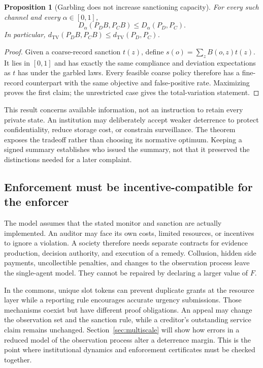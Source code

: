 \documentclass[11pt,letterpaper]{article}
\theoremstyle{plain}
\newtheorem{proposition}{Proposition}[section]
\theoremstyle{definition}
\theoremstyle{remark}
\newcommand{\TV}{d_{\mathrm{TV}}}
\begin{document}
\begin{proposition}[Garbling does not increase sanctioning capacity]\label{prop:enforcement-garbling}
For every such channel and every $\alpha\in[0,1]$,
\[
D_\alpha(P_D B,P_C B)\leq D_\alpha(P_D,P_C).
\]
In particular, $\TV(P_D B,P_C B)\leq\TV(P_D,P_C)$.
\end{proposition}
\begin{proof}
Given a coarse-record sanction $t(z)$, define $s(o)=\sum_z B(o,z)t(z)$. It lies in $[0,1]$ and has exactly the same compliance and deviation expectations as $t$ has under the garbled laws. Every feasible coarse policy therefore has a fine-record counterpart with the same objective and false-positive rate. Maximizing proves the first claim; the unrestricted case gives the total-variation statement.
\end{proof}

This result concerns available information, not an instruction to retain every private state. An institution may deliberately accept weaker deterrence to protect confidentiality, reduce storage cost, or constrain surveillance. The theorem exposes the tradeoff rather than choosing its normative optimum. Keeping a signed summary establishes who issued the summary, not that it preserved the distinctions needed for a later complaint.

\subsection{Enforcement must be incentive-compatible for the enforcer}
The model assumes that the stated monitor and sanction are actually implemented. An auditor may face its own costs, limited resources, or incentives to ignore a violation. A society therefore needs separate contracts for evidence production, decision authority, and execution of a remedy. Collusion, hidden side payments, uncollectible penalties, and changes to the observation process leave the single-agent model. They cannot be repaired by declaring a larger value of $F$.

In the commons, unique slot tokens can prevent duplicate grants at the resource layer while a reporting rule encourages accurate urgency submissions. Those mechanisms coexist but have different proof obligations. An appeal may change the observation set and the sanction rule, while a creditor's outstanding service claim remains unchanged. Section~\ref{sec:multiscale} will show how errors in a reduced model of the observation process alter a deterrence margin. This is the point where institutional dynamics and enforcement certificates must be checked together.
\end{document}
